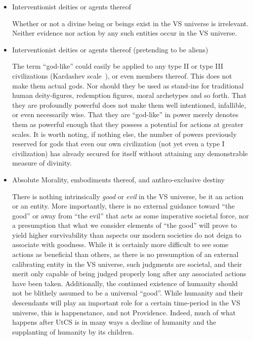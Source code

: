 \begin{itemize}

\item Interventionist deities or agents thereof

Whether or not a divine being or beings exist in the VS universe is
irrelevant. Neither evidence nor action by any such entities occur in
the VS universe.

\item Interventionist deities or agents thereof (pretending to be aliens)

The term ``god-like'' could easily be applied to any type II or type
III civilizations (Kardashev scale~\cite{Kardashev}), or even members
thereof. This does not make them actual gods. Nor should they be used
as stand-ins for traditional human deity-figures, redemption figures,
moral archetypes and so forth. That they are profoundly powerful does
not make them well intentioned, infallible, or even necessarily
wise. That they are ``god-like'' in power merely denotes them as
powerful enough that they possess a potential for actions at greater
scales. It is worth noting, if nothing else, the number of powers
previously reserved for gods that even our own civilization (not yet
even a type I civilization) has already secured for itself without attaining
any demonstrable measure of divinity.

\item Absolute Morality, embodiments thereof, and anthro-exclusive destiny

There is nothing intrinsically {\em good} or {\em evil} in the VS
universe, be it an action or an entity. More importantly, there is no
external guidance toward ``the good'' or away from ``the evil'' that
acts as some imperative societal force, nor a presumption that what we
consider elements of ``the good'' will prove to yield higher
survivability than aspects our modern societies do not deign to
associate with goodness. While it is certainly more difficult to see
some actions as beneficial than others, as there is no presumption of
an external calibrating entity in the VS universe, such judgments are
societal, and their merit only capable of being judged properly long
after any associated actions have been taken. Additionally, the
continued existence of humanity should not be blithely assumed to be a
universal ``good''. While humanity and their descendants will play an
important role for a certain time-period in the VS universe, this is
happenstance, and not Providence. Indeed, much of what happens after
UtCS is in many ways a decline of humanity and the supplanting of
humanity by its children.


\end{itemize}
